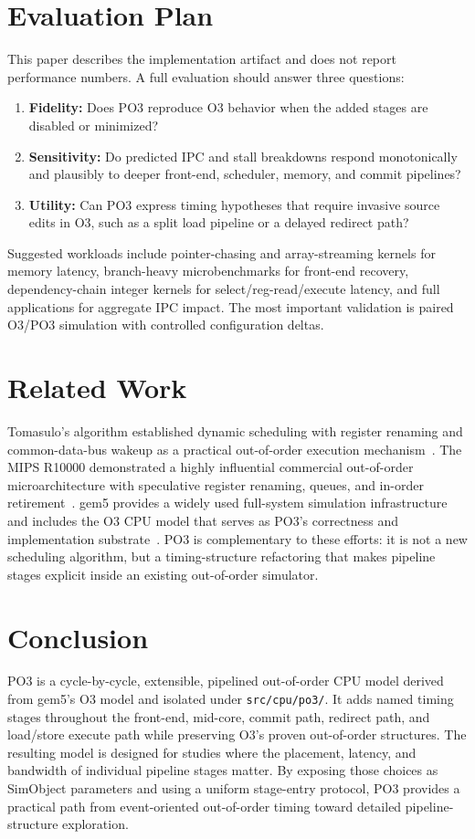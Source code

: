 \documentclass[10pt,twocolumn]{article}
\newcommand{\po}{\textsc{PO3}}
\newcommand{\oo}{\textsc{O3}}
\newcommand{\gem}{gem5}
\begin{document}
\section{Evaluation Plan}
This paper describes the implementation artifact and does not report performance numbers.  A full evaluation should answer three questions:
\begin{enumerate}
  \item \textbf{Fidelity:} Does \po{} reproduce \oo{} behavior when the added stages are disabled or minimized?
  \item \textbf{Sensitivity:} Do predicted IPC and stall breakdowns respond monotonically and plausibly to deeper front-end, scheduler, memory, and commit pipelines?
  \item \textbf{Utility:} Can \po{} express timing hypotheses that require invasive source edits in \oo{}, such as a split load pipeline or a delayed redirect path?
\end{enumerate}
Suggested workloads include pointer-chasing and array-streaming kernels for memory latency, branch-heavy microbenchmarks for front-end recovery, dependency-chain integer kernels for select/reg-read/execute latency, and full applications for aggregate IPC impact.  The most important validation is paired \oo{}/\po{} simulation with controlled configuration deltas.

\section{Related Work}
Tomasulo's algorithm established dynamic scheduling with register renaming and common-data-bus wakeup as a practical out-of-order execution mechanism~\cite{tomasulo1967}.  The MIPS R10000 demonstrated a highly influential commercial out-of-order microarchitecture with speculative register renaming, queues, and in-order retirement~\cite{yeager1996}.  \gem{} provides a widely used full-system simulation infrastructure and includes the \oo{} CPU model that serves as \po{}'s correctness and implementation substrate~\cite{binkert2011gem5,lowepower2020gem5}.  \po{} is complementary to these efforts: it is not a new scheduling algorithm, but a timing-structure refactoring that makes pipeline stages explicit inside an existing out-of-order simulator.

\section{Conclusion}
\po{} is a cycle-by-cycle, extensible, pipelined out-of-order CPU model derived from \gem{}'s \oo{} model and isolated under \texttt{src/cpu/po3/}.  It adds named timing stages throughout the front-end, mid-core, commit path, redirect path, and load/store execute path while preserving \oo{}'s proven out-of-order structures.  The resulting model is designed for studies where the placement, latency, and bandwidth of individual pipeline stages matter.  By exposing those choices as SimObject parameters and using a uniform stage-entry protocol, \po{} provides a practical path from event-oriented out-of-order timing toward detailed pipeline-structure exploration.
\end{document}
